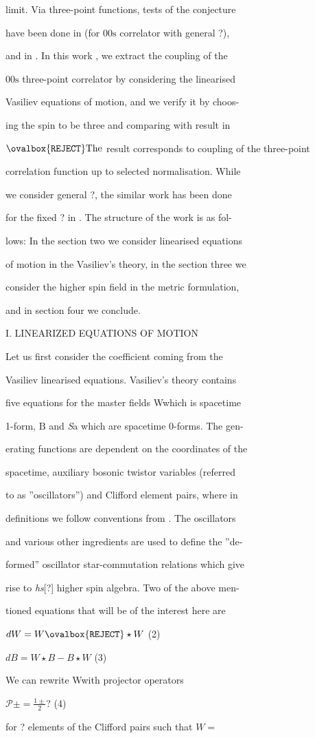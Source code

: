 \documentclass[a4paper,12pt]{article}
\begin{document}
limit. Via three-point functions, tests of the conjecture

have been done in (for $00\mathrm{s}$ correlator with general ?),

and in . In this work , we extract the coupling of the

$00\mathrm{s}$ three-point correlator by considering the linearised

Vasiliev equations of motion, and we verify it by choos-

ing the spin to be three and comparing with result in

$\ovalbox{\tt\small REJECT} \mathrm{T}\mathrm{h}\mathrm{e}$ result corresponds to coupling of the three-point

correlation function up to selected normalisation. While

we consider general ?, the similar work has been done

for the fixed ? in . The structure of the work is as fol-

lows: In the section two we consider linearised equations

of motion in the Vasiliev’s theory, in the section three we

consider the higher spin field in the metric formulation,

and in section four we conclude.

I. LINEARIZED EQUATIONS OF MOTION

Let us first consider the coefficient coming from the

Vasiliev linearised equations. Vasiliev’s theory contains

five equations for the master fields Wwhich is spacetime

1-form, $\mathrm{B}$ and {\it S}a which are spacetime 0-forms. The gen-

erating functions are dependent on the coordinates of the

spacetime, auxiliary bosonic twistor variables (referred

to as ”oscillators”) and Clifford element pairs, where in

definitions we follow conventions from . The oscillators

and various other ingredients are used to define the ”de-

formed” oscillator star-commutation relations which give

rise to {\it hs}[?] higher spin algebra. Two of the above men-

tioned equations that will be of the interest here are
\begin{center}
$dW=W\ovalbox{\tt\small REJECT}\star W$   (2)

$dB=W\star B-B\star W$   (3)
\end{center}
We can rewrite Wwith projector operators
\begin{center}
$\displaystyle \mathcal{P}\pm=\frac{1\pm}{2}$?   (4)
\end{center}
for ? elements of the Clifford pairs such that $W =$
\end{document}
